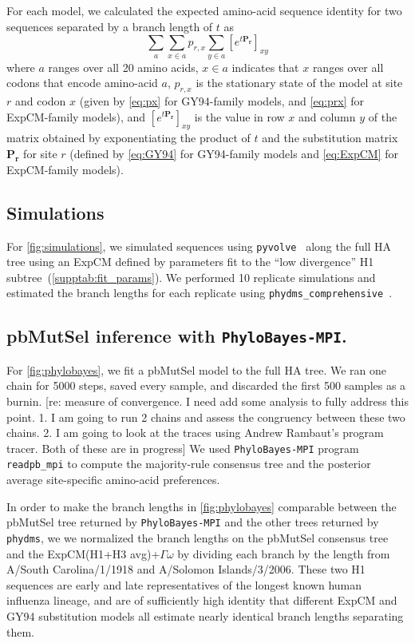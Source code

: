 \documentclass[11pt]{article}
\newcommand\skhcomment[1]{{\color{cyan}[#1]}}
\begin{document}
For each model, we calculated the expected amino-acid sequence identity for two sequences separated by a branch length of $t$ as 
\begin{equation}
\label{eq:f}
\sum_a \sum_{x \in a} p_{r,x} \sum_{y \in a} \left[e^{t\mathbf{P_r}}\right]_{xy}
\end{equation}
where $a$ ranges over all 20 amino acids, $x \in a$ indicates that $x$ ranges over all codons that encode amino-acid $a$, $p_{r,x}$ is the stationary state of the model at site $r$ and codon $x$ (given by \ref{eq:px} for GY94-family models, and \ref{eq:prx} for ExpCM-family models), and $\left[e^{t\mathbf{P_r}}\right]_{xy}$ is the value in row $x$ and column $y$ of the matrix obtained by exponentiating the product of $t$ and the substitution matrix $\mathbf{P_r}$ for site $r$ (defined by \ref{eq:GY94} for GY94-family models and \ref{eq:ExpCM} for ExpCM-family models).

\subsection*{Simulations}
For \ref{fig:simulations}, we simulated sequences using \texttt{pyvolve}~\citep{spielman2015pyvolve} along the full HA tree using an ExpCM defined by parameters fit to the ``low divergence'' H1 subtree~(\ref{supptab:fit_params}). We performed 10 replicate simulations and estimated the branch lengths for each replicate using \texttt{phydms\_comprehensive}~\citep{hilton2017phydms}. 

\subsection*{pbMutSel inference with \texttt{PhyloBayes-MPI}.}
For \ref{fig:phylobayes}, we fit a pbMutSel model to the full HA tree. 
We ran one chain for 5000 steps, saved every sample, and discarded the first 500 samples as a burnin. 
\skhcomment{re: measure of convergence. I need add some analysis to fully address this point. 1. I am going to run 2 chains and assess the congruency between these two chains. 2. I am going to look at the traces using Andrew Rambaut's program tracer. Both of these are in progress}
We used \texttt{PhyloBayes-MPI} program \texttt{readpb\_mpi} to compute the majority-rule consensus tree and the posterior average site-specific amino-acid preferences. 

In order to make the branch lengths in \ref{fig:phylobayes} comparable between the pbMutSel tree returned by \texttt{PhyloBayes-MPI} and the other trees returned by \texttt{phydms}, we we normalized the branch lengths on the pbMutSel consensus tree and the ExpCM(H1+H3 avg)+$\Gamma\omega$ by dividing each branch by the length from A/South Carolina/1/1918 and A/Solomon Islands/3/2006. 
These two H1 sequences are early and late representatives of the longest known human influenza lineage, and are of sufficiently high identity that different ExpCM and GY94 substitution models all estimate nearly identical branch lengths separating them. 
\end{document}
